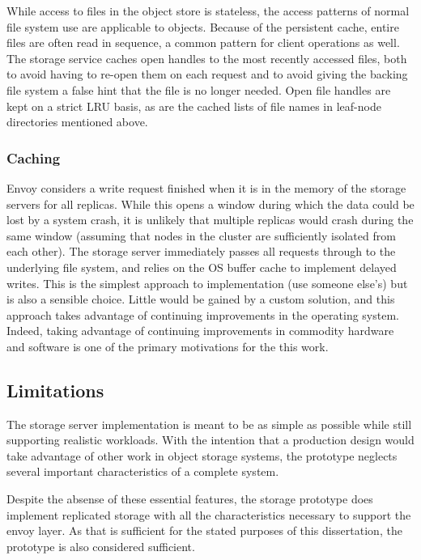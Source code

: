While access to files in the object store is stateless, the access patterns of normal file system use are applicable to objects. Because of the persistent cache, entire files are often read in sequence, a common pattern for client operations as well. The storage service caches open handles to the most recently accessed files, both to avoid having to re-open them on each request and to avoid giving the backing file system a false hint that the file is no longer needed. Open file handles are kept on a strict LRU basis, as are the cached lists of file names in leaf-node directories mentioned above.

\subsubsection{Caching}

Envoy considers a write request finished when it is in the memory of the storage servers for all replicas. While this opens a window during which the data could be lost by a system crash, it is unlikely that multiple replicas would crash during the same window (assuming that nodes in the cluster are sufficiently isolated from each other). The storage server immediately passes all requests through to the underlying file system, and relies on the OS buffer cache to implement delayed writes. This is the simplest approach to implementation (use someone else's) but is also a sensible choice. Little would be gained by a custom solution, and this approach takes advantage of continuing improvements in the operating system. Indeed, taking advantage of continuing improvements in commodity hardware and software is one of the primary motivations for the this work.

\subsection{Limitations}

The storage server implementation is meant to be as simple as possible while still supporting realistic workloads. With the intention that a production design would take advantage of other work in object storage systems, the prototype neglects several important characteristics of a complete system.

Despite the absense of these essential features, the storage prototype does implement replicated storage with all the characteristics necessary to support the envoy layer. As that is sufficient for the stated purposes of this dissertation, the prototype is also considered sufficient.


